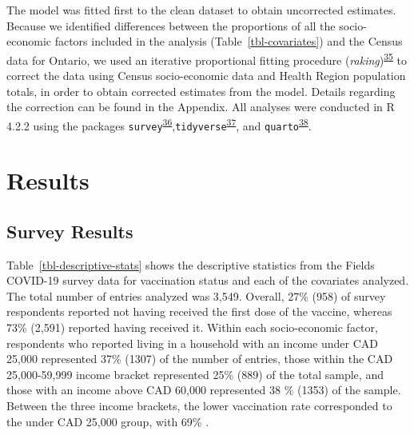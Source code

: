 \documentclass[
  letterpaper,
  DIV=11,
  numbers=noendperiod]{scrartcl}
\begin{document}
The model was fitted first to the clean dataset to obtain uncorrected
estimates. Because we identified differences between the proportions of
all the socio-economic factors included in the analysis
(Table~\ref{tbl-covariates}) and the Census data for Ontario, we used an
iterative proportional fitting procedure
(\emph{raking})\textsuperscript{\protect\hyperlink{ref-deming1940}{35}}
to correct the data using Census socio-economic data and Health Region
population totals, in order to obtain corrected estimates from the
model. Details regarding the correction can be found in the Appendix.
All analyses were conducted in R 4.2.2 using the packages
\texttt{survey}\textsuperscript{\protect\hyperlink{ref-lumley2011}{36}},\texttt{tidyverse}\textsuperscript{\protect\hyperlink{ref-wickham2019}{37}},
and \texttt{quarto}\textsuperscript{\protect\hyperlink{ref-quarto}{38}}.

\hypertarget{results}{%
\section{Results}\label{results}}

\hypertarget{survey-results}{%
\subsection{Survey Results}\label{survey-results}}

Table~\ref{tbl-descriptive-stats} shows the descriptive statistics from
the Fields COVID-19 survey data for vaccination status and each of the
covariates analyzed. The total number of entries analyzed was 3,549.
Overall, 27\% (958) of survey respondents reported not having received
the first dose of the vaccine, whereas 73\% (2,591) reported having
received it. Within each socio-economic factor, respondents who reported
living in a household with an income under CAD 25,000 represented 37\%
(1307) of the number of entries, those within the CAD 25,000-59,999
income bracket represented 25\% (889) of the total sample, and those
with an income above CAD 60,000 represented 38 \% (1353) of the sample.
Between the three income brackets, the lower vaccination rate
corresponded to the under CAD 25,000 group, with 69\% .
\end{document}
